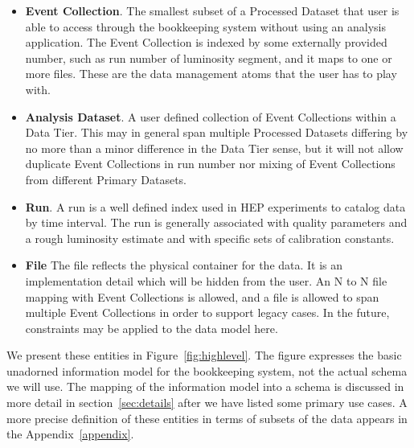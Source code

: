 \documentclass{cmspaper}
\begin{document}
\begin{itemize}
\item{\bf Event Collection}. The smallest subset of a Processed Dataset that
user is able to access through the bookkeeping system without using an
analysis application.  The Event Collection is indexed by some externally 
provided number, such as run number of luminosity segment, and it maps to 
one or more files.  These are the data management atoms that 
the user has to play with.

\item {\bf Analysis Dataset}. A user defined collection of Event Collections 
within a Data Tier.  This may in general span multiple Processed Datasets 
differing by no more than a minor difference in the Data Tier sense, but 
it will not allow duplicate Event Collections in run number nor mixing of 
Event Collections from different Primary Datasets.

\item {\bf Run}.  A run is a well defined index used in HEP experiments to 
catalog data by time interval. The run is generally associated with quality 
parameters and a rough luminosity estimate and with specific sets of calibration
constants.

\item {\bf File}  The file reflects the physical container for the data.  It is
an implementation detail which will be hidden from the user.  An N to N file 
mapping with Event Collections is allowed, and a file is allowed to span 
multiple Event Collections in order to support legacy cases.  In the future, 
constraints may be applied to the data model here.

\end{itemize} 

We present these entities in Figure~\ref{fig:highlevel}.  
The figure expresses the basic unadorned information model
for the bookkeeping system, not the actual schema we will use.
The mapping of the information model into a schema is discussed in more
detail in section~\ref{sec:details} after we have listed some primary use
cases.  A more precise definition of these entities in terms of subsets of
the data appears in the Appendix~\ref{appendix}.
\end{document}
